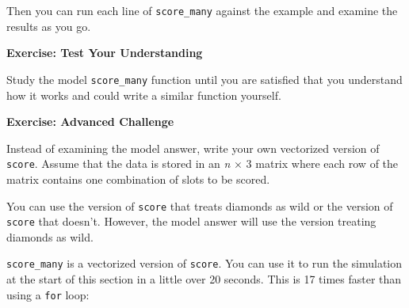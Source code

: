 \documentclass[
  letterpaper,
  DIV=11,
  numbers=noendperiod]{scrbook}
\begin{document}
Then you can run each line of \texttt{score\_many} against the example
and examine the results as you go.

\begin{tcolorbox}[enhanced jigsaw, left=2mm, breakable, colback=white, colframe=quarto-callout-color-frame, leftrule=.75mm, bottomrule=.15mm, arc=.35mm, opacityback=0, rightrule=.15mm, toprule=.15mm]

\vspace{-3mm}\textbf{Exercise: Test Your Understanding}\vspace{3mm}

Study the model \texttt{score\_many} function until you are satisfied
that you understand how it works and could write a similar function
yourself.

\end{tcolorbox}

\begin{tcolorbox}[enhanced jigsaw, left=2mm, breakable, colback=white, colframe=quarto-callout-color-frame, leftrule=.75mm, bottomrule=.15mm, arc=.35mm, opacityback=0, rightrule=.15mm, toprule=.15mm]

\vspace{-3mm}\textbf{Exercise: Advanced Challenge}\vspace{3mm}

Instead of examining the model answer, write your own vectorized version
of \texttt{score}. Assume that the data is stored in an \emph{n} × 3
matrix where each row of the matrix contains one combination of slots to
be scored.

You can use the version of \texttt{score} that treats diamonds as wild
or the version of \texttt{score} that doesn't. However, the model answer
will use the version treating diamonds as wild.

\end{tcolorbox}

\texttt{score\_many} is a vectorized version of \texttt{score}. You can
use it to run the simulation at the start of this section in a little
over 20 seconds. This is 17 times faster than using a \texttt{for} loop:
\end{document}
